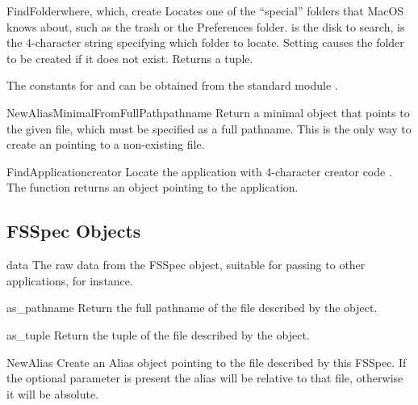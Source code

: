 \begin{funcdesc}{FindFolder}{where, which, create}
Locates one of the ``special'' folders that MacOS knows about, such as
the trash or the Preferences folder.  is the disk to
search,  is the 4-character string specifying which folder to
locate. Setting  causes the folder to be created if it
does not exist. Returns a  tuple.

The constants for  and  can be obtained from the
standard module .
\end{funcdesc}

\begin{funcdesc}{NewAliasMinimalFromFullPath}{pathname}
Return a minimal  object that points to the given file, which
must be specified as a full pathname. This is the only way to create an
 pointing to a non-existing file.

\end{funcdesc}

\begin{funcdesc}{FindApplication}{creator}
Locate the application with 4-character creator code . The
function returns an  object pointing to the application.
\end{funcdesc}


\subsection{FSSpec Objects \label{fsspec-objects}}

\begin{memberdesc}[FSSpec]{data}
The raw data from the FSSpec object, suitable for passing
to other applications, for instance.
\end{memberdesc}

\begin{methoddesc}[FSSpec]{as_pathname}{}
Return the full pathname of the file described by the 
object.
\end{methoddesc}

\begin{methoddesc}[FSSpec]{as_tuple}{}
Return the  tuple of
the file described by the  object.
\end{methoddesc}

\begin{methoddesc}[FSSpec]{NewAlias}{}
Create an Alias object pointing to the file described by this
FSSpec. If the optional  parameter is present the alias
will be relative to that file, otherwise it will be absolute.
\end{methoddesc}

